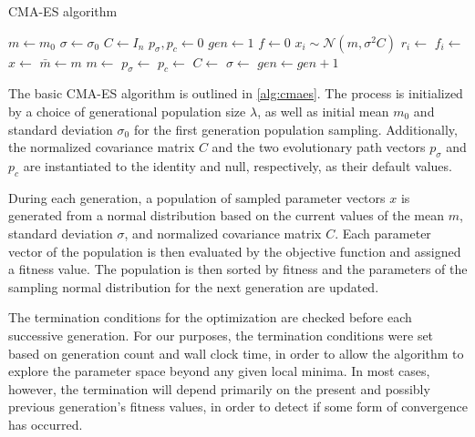 \documentclass[conference,11pt,letterpaper]{IEEEtran}
\begin{document}
	
	\begin{algorithm}
		\caption{CMA-ES algorithm}
		\label{alg:cmaes}
		\begin{algorithmic}[1]
			\Statex
			\State $m \gets m_0$  
			\State $\sigma \gets \sigma_0$ 
			\State $C \gets I_{n}$ 
			\State $p_{\sigma},p_c \gets 0$ 
			\State $gen \gets 1$ 
			\State $f \gets 0$ 
			\Statex
			\Statex
			\State $x_i \sim \mathcal{N}(m,\sigma^{2}C)$
			\State $r_i \gets$ 
			\State $f_i \gets$ 
			\EndFor
			\Statex
			\State $x \gets$  
			\State $\bar{m} \gets m$ 
			\State $m \gets$ 
			\State $p_\sigma \gets$ 
			\State $p_c \gets$ 
			\State $C \gets$ 
			\State $\sigma \gets$ 
			\State $gen \gets gen+1$
			\Statex
			\EndWhile
			\EndFunction
		\end{algorithmic}
	\end{algorithm}
	
	The basic CMA-ES algorithm is outlined in \cref{alg:cmaes}. The process is initialized by a choice of generational population size $\lambda$, as well as initial mean $m_0$ and standard deviation $\sigma_0$ for the first generation population sampling. Additionally, the normalized covariance matrix $C$ and the two evolutionary path vectors $p_\sigma$ and $p_c$ are instantiated to the identity and null, respectively, as their default values.
	
	During each generation, a population of sampled parameter vectors $x$ is generated from a normal distribution based on the current values of the mean $m$, standard deviation $\sigma$, and normalized covariance matrix $C$. Each parameter vector of the population is then evaluated by the objective function and assigned a fitness value. The population is then sorted by fitness and the parameters of the sampling normal distribution for the next generation are updated. 
	
	The termination conditions for the optimization are checked before each successive generation. For our purposes, the termination conditions were set based on generation count and wall clock time, in order to allow the algorithm to explore the parameter space beyond any given local minima. In most cases, however, the termination will depend primarily on the present and possibly previous generation's fitness values, in order to detect if some form of convergence has occurred.
\end{document}
